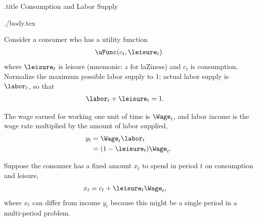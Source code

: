 \documentclass{handout}
\begin{document}
\large
\handoutHeader

\begin{verbatimwrite}{\jobname.title}
Consumption and Labor Supply
\end{verbatimwrite}

\handoutNameMake

\begin{verbatimwrite}{./body.tex}

Consider a consumer who has a utility function
\begin{equation}\begin{gathered}\begin{aligned}
   \uFunc(c_{t},\leisure_{t})
\end{aligned}\end{gathered}\end{equation}
where $\leisure_{t}$ is leisure (mnemonic: $z$ for laZiness) and $c_{t}$ is
consumption.  Normalize the maximum possible labor supply
to $1$; actual labor supply is $\labor_{t}$, so
that
\begin{equation}\begin{gathered}\begin{aligned}
  \labor_{t} + \leisure_{t} & =  1.
\end{aligned}\end{gathered}\end{equation}

The wage earned for working one unit of time is $\Wage_{t}$, and labor
income is the wage rate multiplied by the amount of labor supplied,
\begin{equation}\begin{gathered}\begin{aligned}
  y_{t} & =  \Wage_{t}\labor_{t}
\\  & =  (1-\leisure_{t})\Wage_{t}.
\end{aligned}\end{gathered}\end{equation}

Suppose the consumer has a fixed amount $x_{t}$ to spend in period $t$ on consumption and leisure,
\begin{equation}\begin{gathered}\begin{aligned}
  \label{eq:xdef}
  x_{t} & =  c_{t}+\leisure_{t} \Wage_{t},
\end{aligned}\end{gathered}\end{equation}
where $x_{t}$ can differ from income $y_{t}$ because this might be a 
single period in a multi-period problem.


\end{verbatimwrite}
\end{document}
